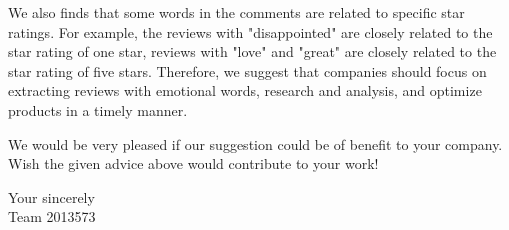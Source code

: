 \documentclass{mcmthesis}
\begin{document}
\begin{memo}
We also finds that some words in the comments are related to specific star ratings. For example, the reviews with "disappointed" are closely related to the star rating of one star, reviews with "love" and "great" are closely related to the star rating of five stars. Therefore, we suggest that companies should focus on extracting reviews with emotional words, research and analysis, and optimize products in a timely manner.

We would be very pleased if our suggestion could be of benefit to your company. Wish the given advice above would contribute to your work! 

\begin{flushright}
	Your sincerely\\
	 Team 2013573
\end{flushright}

\thispagestyle{empty}

\end{memo}
\end{document}
